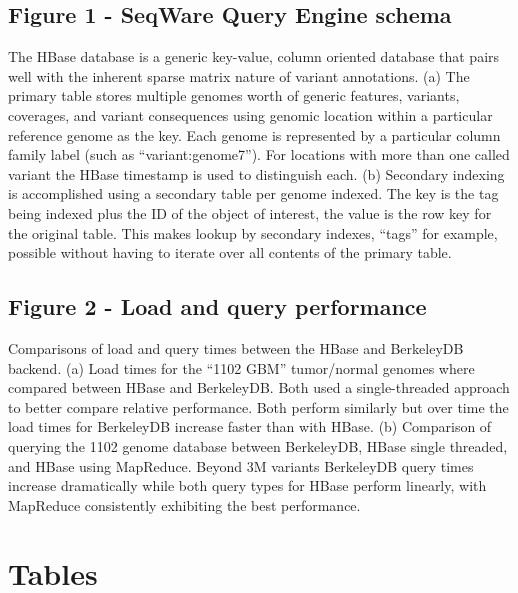 \documentclass[10pt]{bmc_article}
\newenvironment{bmcformat}{\begin{raggedright}\baselineskip20pt\sloppy\setboolean{publ}{false}}{\end{raggedright}\baselineskip20pt\sloppy}
\begin{document}
\begin{bmcformat}
  \subsection*{Figure 1 - SeqWare Query Engine schema}
      The HBase database is a generic key-value, column oriented database that pairs well with the inherent sparse matrix nature of variant annotations. (a) The primary table stores multiple genomes worth of generic features, variants, coverages, and variant consequences using genomic location within a particular reference genome as the key. Each genome is represented by a particular column family label (such as “variant:genome7”). For locations with more than one called variant the HBase timestamp is used to distinguish each. (b) Secondary indexing is accomplished using a secondary table per genome indexed. The key is the tag being indexed plus the ID of the object of interest, the value is the row key for the original table. This makes lookup by secondary indexes, “tags” for example, possible without having to iterate over all contents of the primary table.

  \subsection*{Figure 2 - Load and query performance}
      Comparisons of load and query times between the HBase and BerkeleyDB backend. (a) Load times for the “1102 GBM” tumor/normal genomes where compared between HBase and BerkeleyDB. Both used a single-threaded approach to better compare relative performance. Both perform similarly but over time the load times for BerkeleyDB increase faster than with HBase. (b) Comparison of querying the 1102 genome database between BerkeleyDB, HBase single threaded, and HBase using MapReduce. Beyond 3M variants BerkeleyDB query times increase dramatically while both query types for HBase perform linearly, with MapReduce consistently exhibiting the best performance.






\section*{Tables}

\end{bmcformat}
\end{document}
